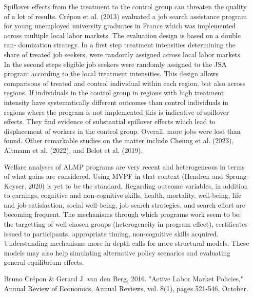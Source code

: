 \documentclass{article}
\begin{document}
Spillover effects from the treatment to the control group can threaten the quality of a lot of results. Crépon et al. (2013) evaluated a job search assistance program for young unemployed university graduates in France which was implemented across
multiple local labor markets. The evaluation design is based on a double ran-
domization strategy. In a first step treatment intensities determining the share of treated job seekers, were randomly assigned across local labor markets. In the
second steps eligible job seekers were randomly assigned to the JSA program
according to the local treatment intensities. This design allows comparisons of treated and control individual within each region, but also across regions. If
individuals in the control group in regions with high treatment intensity have
systematically different outcomes than control individuals in regions where the
program is not implemented this is indicative of spillover effects. They find evidence of substantial spillover effects which lead to displacement of workers in the control group. Overall, more jobs were lost than found. Other remarkable studies on the matter include Cheung et al. (2023), Altmann et al. (2022), and Belot et al. (2019).

Welfare analyses of ALMP programs are very recent and heterogeneous in terms of what gains are considered. Using MVPF in that context (Hendren and Sprung-Keyser, 2020) is yet to be the standard. Regarding outcome variables, in addition to earnings, cognitive and non-cognitive skills, health, mortality, well-being, life and job satisfaction, social well-being, job search strategies, and search effort are becoming frequent. The mechanisms through which programs work seem to be: the targetting of well chosen groups (heterogeneity in program effect), certificates issued to participants, appropriate timing, non-cognitive skills acquired. Understanding mechanisms more in depth calls for more structural models. These models may also help simulating alternative policy scenarios and evaluating general equilibrium effects.

\begin{thebibliography}{9}

Bruno Crépon \& Gerard J. van den Berg, 2016. "Active Labor Market Policies," Annual Review of Economics, Annual Reviews, vol. 8(1), pages 521-546, October.


\end{thebibliography}
\end{document}
